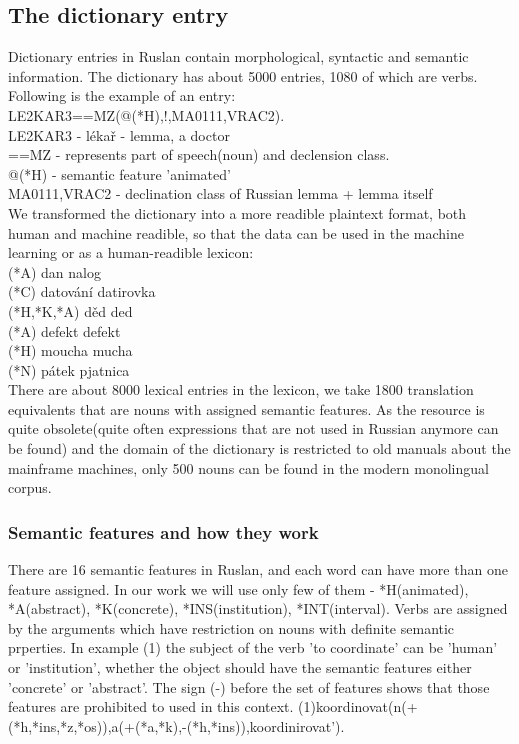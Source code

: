 \documentclass[10pt,a5paper,twoside]{article}
\begin{document}
\subsection{The dictionary entry} 
Dictionary entries in Ruslan contain morphological,
syntactic  and semantic information. 
The dictionary has about 5000 entries, 1080 of which are verbs.
Following is the example of an entry:\\
LE2KAR3==MZ(@(*H),!,MA0111,VRAC2).\\
LE2KAR3 - lékař - lemma, a doctor\\
==MZ - represents part of speech(noun) and declension class.\\
@(*H) - semantic feature 'animated'\\
MA0111,VRAC2 - declination class of Russian lemma + lemma itself\\
We transformed the dictionary into a more readible plaintext format,
both human and machine readible, so that the data can be used in
the machine learning or as a human-readible lexicon:\\
(*A)    dan     nalog\\
(*C)    datování        datirovka\\
(*H,*K,*A)      děd     ded\\
(*A)    defekt  defekt\\
(*H)    moucha  mucha\\
(*N)    pátek    pjatnica\\
There are about 8000 lexical entries in the lexicon, we take 1800 
translation equivalents that are nouns with assigned semantic features. 
As the resource is quite obsolete(quite often expressions that are not used in Russian
anymore can be found) and the domain of the dictionary is restricted to old manuals
about the mainframe machines, only 500 nouns
can be found in the modern monolingual corpus.

\subsubsection{Semantic features and how they work}
There are 16 semantic features in Ruslan, and each word can have more than one 
feature assigned. In our work we will use only few of them - *H(animated), *A(abstract),
*K(concrete), *INS(institution), *INT(interval). Verbs are assigned by the arguments
which have restriction on nouns with definite semantic prperties. In example (1)
the subject of the verb 'to coordinate' can be 'human' or 'institution', whether
the object should have the semantic features either 'concrete' or 'abstract'. The sign (-)
before the set of features shows that those features are prohibited to used in this context. 
(1)koordinovat(n(+(*h,*ins,*z,*os)),a(+(*a,*k),-(*h,*ins)),koordinirovat').
\end{document}
